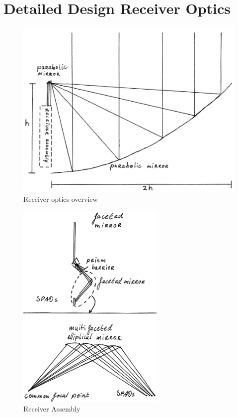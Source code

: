 \section{Detailed Design Receiver Optics}
\label{sec:DDreceiver}

\begin{figure}[ht!]
\centering
\includegraphics[scale = 0.5]{chapters/img/DiagramReceiverGeneral.png}
\caption{Receiver optics overview}
\label{fig:receiver_overview}
\end{figure} 

\begin{figure}[ht!]
\centering
\includegraphics[scale = 0.6]{chapters/img/DiagramReceiverAssemblyFacetedMirror.png}
\caption{Receiver Assembly}
\label{fig:receiver_assembly}
\end{figure} 

